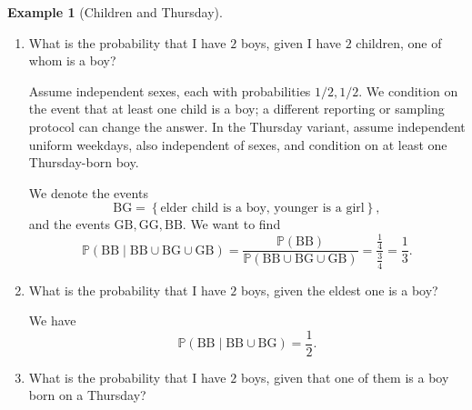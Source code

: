 \documentclass[11pt]{article}
\numberwithin{equation}{section}
\theoremstyle{definition}
\newtheorem{example}[theorem]{Example}
\theoremstyle{remark}
\newcommand{\pqty}[1]{\left(#1\right)}
\newcommand{\Bqty}[1]{\left\{#1\right\}}
\newcommand{\Prob}{\mathbb P}
\newcommand{\Conditional}[2]{#1\mid #2}
\begin{document}
\begin{example}[Children and Thursday]\label{probability-example-011}
    \label{probability-ex:children-thursday}%
    \begin{enumerate}
        \item What is the probability that I have \(2\) boys, given I have \(2\) children, one of whom is a boy?
    
            Assume independent sexes, each with probabilities \(1/2,1/2\). We condition on the event that at least one child is a boy; a different reporting or sampling protocol can change the answer. In the Thursday variant, assume independent uniform weekdays, also independent of sexes, and condition on at least one Thursday-born boy.

            We denote the events
            \[
                \mathrm{BG} = \Bqty{\text{elder child is a boy, younger is a girl}},
            \]
            and the events \(\mathrm{GB}, \mathrm{GG}, \mathrm{BB}\). We want to find
            \[
                \Prob\pqty{\Conditional{\mathrm{BB}}{\mathrm{BB} \cup \mathrm{BG} \cup \mathrm{GB}}} = \frac{\Prob\pqty{\mathrm{BB}}}{\Prob\pqty{\mathrm{BB} \cup \mathrm{BG} \cup \mathrm{GB}}} = \frac{\frac{1}{4}}{\frac{3}{4}} = \frac{1}{3}.
            \]

        \item What is the probability that I have \(2\) boys, given the eldest one is a boy?
        
            We have
            \[
                \Prob\pqty{\Conditional{\mathrm{BB}}{\mathrm{BB} \cup \mathrm{BG}}} = \frac{1}{2}.
            \]

        \item What is the probability that I have \(2\) boys, given that one of them is a boy born on a Thursday?
        

\end{enumerate}
\end{example}
\end{document}
